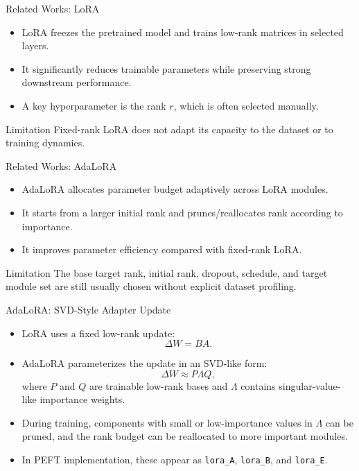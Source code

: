 \begin{frame}{Related Works: LoRA}
\begin{itemize}
  \item LoRA freezes the pretrained model and trains low-rank matrices in selected layers.
  \item It significantly reduces trainable parameters while preserving strong downstream performance.
  \item A key hyperparameter is the rank \(r\), which is often selected manually.
\end{itemize}

\vspace{8pt}
\begin{block}{Limitation}
Fixed-rank LoRA does not adapt its capacity to the dataset or to training dynamics.
\end{block}
\end{frame}

\begin{frame}{Related Works: AdaLoRA}
\begin{itemize}
  \item AdaLoRA allocates parameter budget adaptively across LoRA modules.
  \item It starts from a larger initial rank and prunes/reallocates rank according to importance.
  \item It improves parameter efficiency compared with fixed-rank LoRA.
\end{itemize}

\vspace{8pt}
\begin{block}{Limitation}
The base target rank, initial rank, dropout, schedule, and target module set are still usually chosen without explicit dataset profiling.
\end{block}
\end{frame}

\begin{frame}{AdaLoRA: SVD-Style Adapter Update}
\small
\begin{itemize}
  \item LoRA uses a fixed low-rank update:
  \[
    \Delta W = BA.
  \]
  \item AdaLoRA parameterizes the update in an SVD-like form:
  \[
    \Delta W \approx P \Lambda Q,
  \]
  where \(P\) and \(Q\) are trainable low-rank bases and \(\Lambda\) contains singular-value-like importance weights.
  \item During training, components with small or low-importance values in \(\Lambda\) can be pruned, and the rank budget can be reallocated to more important modules.
  \item In PEFT implementation, these appear as \texttt{lora\_A}, \texttt{lora\_B}, and \texttt{lora\_E}.
\end{itemize}
\end{frame}

